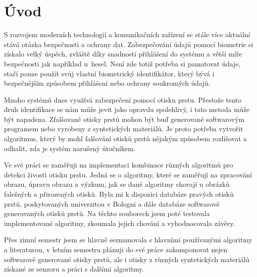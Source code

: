 \chapter{Úvod}
S rozvojem moderních technologií a komunikačních zařízení se stále více aktuální stává otázka bezpečnosti a ochrany dat. Zabezpečování údajů pomocí biometrie si získalo velký úspěch, zvláště díky snadnosti přihlášení do systému a větší míře bezpečnosti jak například u~hesel. Není zde totiž potřeba si pamatovat údaje, stačí pouze použít svůj vlastní biometrický identifikátor, který bývá i bezpečnějším způsobem přihlášení nebo ochrany soukromých údajů. 

Mnoho systémů dnes využívá zabezpečení pomocí otisku prstu. Přestože tento druh identifikace se nám může jevit jako opravdu spolehlivý, i tato metoda může být napadena. Zfalšované otisky prstů mohou být buď generované softwarovým programem nebo vyrobeny z syntetických materiálů. Je proto potřeba vytvořit algoritmus, který by mohl falšování otisků prstů nějakým způsobem rozlišovat a odhalit, zda je systém narušený útočníkem.

Ve své práci se zaměřuji na implementaci kombinace různých algoritmů pro detekci živosti otisku prstu. Jedná se o algoritmy, které se zaměřují na zpracování obrazu, úpravu obrazu a výzkum, jak se dané algoritmy chovají u obrázků falešných a přirozených otisků. Byla mi k dispozici databáze pravých otisků prstů, poskytovaných univerzitou v Bologni a dále databáze softwarově generovaných otisků prstů. Na těchto souborech jsem poté testovala implementované algoritmy, zkoumala jejich chování a vyhodnocovala závěry.

Přes zimní semestr jsem se hlavně seznamovala s hlavními používanými algoritmy a literaturou, v letním semestru plánuji do své práce zakomponovat nejen softwarově generované otisky prstů, ale i otisky z různých syntetických materiálů získané ze senzoru a práci s dalšími algoritmy.





